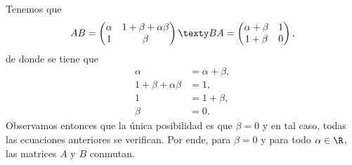 \documentclass[11pt,respuestas,a4]{aleph-examen}
\begin{document}
\begin{preguntas}
\begin{respuesta}
    Tenemos que 
    \[
        AB = \begin{pmatrix}
            \alpha & 1 + \beta + \alpha\beta \\
            1 & \beta
        \end{pmatrix} \texty BA = \begin{pmatrix}
            \alpha+\beta & 1 \\
            1+\beta & 0
        \end{pmatrix},
    \]
    de donde se tiene que 
    \begin{align*}
        \alpha &= \alpha + \beta, \\
        1 + \beta + \alpha\beta &= 1, \\
        1 &= 1 + \beta, \\
        \beta &= 0.
    \end{align*}
    Observamos entonces que la única posibilidad es que $\beta = 0$ y en tal caso, todas las ecuaciones anteriores se verifican. Por ende, para $\beta=0$ y para todo $\alpha\in\R$, las matrices $A$ y $B$ conmutan.
\end{respuesta}

\end{preguntas}
\end{document}
